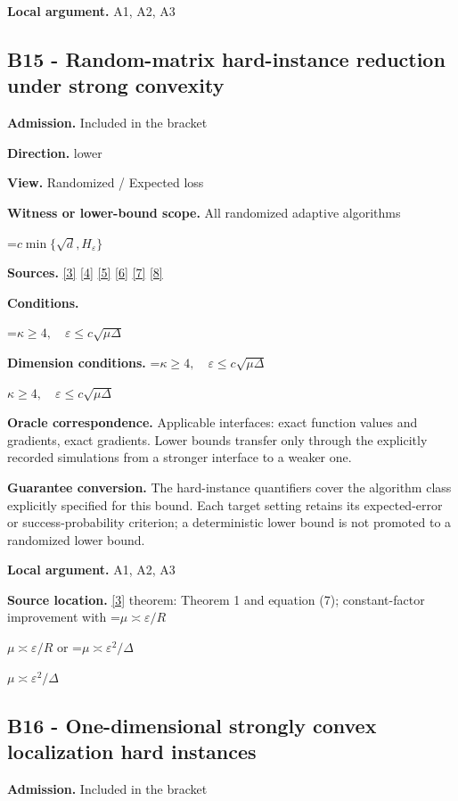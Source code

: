 \documentclass[10pt,a4paper]{article}
\newcommand{\AtlasMath}[1]{\par\begingroup\centering\setbox0=\hbox{$\displaystyle #1$}\ifdim\wd0>1.4\linewidth\typeout{ATLAS WIDE FORMULA: \the\wd0}\fi\ifdim\wd0>\linewidth\resizebox{\linewidth}{!}{\box0}\else\box0\fi\par\endgroup}
\newcommand{\AtlasInlineMath}[1]{\begingroup\setbox0=\hbox{$#1$}\ifdim\wd0>.4\linewidth\endgroup\AtlasMath{#1}\else\endgroup$#1$\fi}
\begin{document}
\textbf{Local argument.} A1, A2, A3

\subsection{B15 - Random-matrix hard-instance reduction under strong convexity}
\textbf{Admission.} Included in the bracket

\textbf{Direction.} lower

\textbf{View.} Randomized / Expected loss

\textbf{Witness or lower-bound scope.} All randomized adaptive algorithms

\AtlasMath{c\min\{\sqrt d,H_\varepsilon\}}
\textbf{Sources.} \href{https://arxiv.org/pdf/2609.10874}{[3]} \href{https://arxiv.org/pdf/2101.09740v2}{[4]} \href{https://arxiv.org/pdf/2609.33360v2}{[5]} \href{https://arxiv.org/pdf/1405.4980}{[6]} \href{https://www2.isye.gatech.edu/~nemirovs/MOR_AccuracyCertificates.pdf}{[7]} \href{https://arxiv.org/pdf/2609.20701}{[8]}

\textbf{Conditions.} 
\AtlasMath{\kappa\ge4,\quad\varepsilon\le c\sqrt{\mu\Delta}}


\textbf{Dimension conditions.} \AtlasInlineMath{\kappa\ge4,\quad\varepsilon\le c\sqrt{\mu\Delta}}

\textbf{Oracle correspondence.} Applicable interfaces: exact function values and gradients, exact gradients. Lower bounds transfer only through the explicitly recorded simulations from a stronger interface to a weaker one.

\textbf{Guarantee conversion.} The hard-instance quantifiers cover the algorithm class explicitly specified for this bound. Each target setting retains its expected-error or success-probability criterion; a deterministic lower bound is not promoted to a randomized lower bound.

\textbf{Local argument.} A1, A2, A3

\textbf{Source location.} \href{https://arxiv.org/pdf/2609.10874}{[3]} theorem: Theorem 1 and equation (7); constant-factor improvement with \AtlasInlineMath{\mu\asymp\varepsilon/R} or \AtlasInlineMath{\mu\asymp\varepsilon^2/\Delta}

\subsection{B16 - One-dimensional strongly convex localization hard instances}
\textbf{Admission.} Included in the bracket
\end{document}
